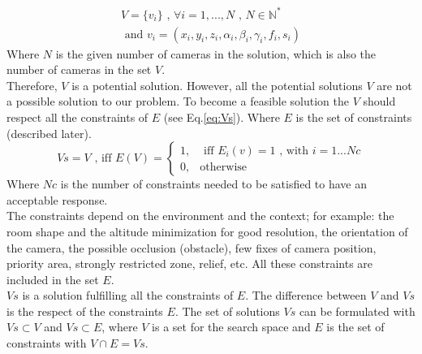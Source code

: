 \begin{equation}\label{eq:V}
\begin{split}
V= \{v_i\} \mbox{  , } \forall i=1,...,N \mbox{ , } N\in \mathbb{N}^*
\\
\mbox{ and } v_i= (x_i,y_i,z_i,\alpha_i ,\beta_i,\gamma_i,f_i,s_i)
\end{split}
\end{equation}
\noindent Where $N$ is the given number of cameras in the solution, which is also the number of cameras in the set $V$. \\
Therefore, $V$ is a potential solution. However, all the potential solutions $V$ are not a possible solution to our problem. To become a feasible solution the $V$ should respect all the constraints of $E$ (see Eq.\ref{eq:Vs}). Where $E$ is the set of constraints (described later).
\begin{equation}\label{eq:Vs}
Vs=V \mbox{ , iff } E(V)=\begin{cases}1, & \mbox{  iff } E_i(v)=1 \mbox{ , with } i=1...Nc \\ 0, & \mbox{otherwise} 
\end{cases} 
\end{equation}
Where $Nc$ is the number of constraints needed to be satisfied to have an acceptable response.\\
The constraints depend on the environment and the context; for example: the room shape and the altitude minimization for good resolution, the orientation of the camera, the possible occlusion (obstacle), few fixes of camera position, priority area, strongly restricted zone, relief, etc. All these constraints are included in the set $E$. \\
$Vs$ is a solution fulfilling all the constraints of $E$. The difference between $V$ and $Vs$ is the respect of the constraints $E$.%
The set of solutions $Vs$ can be formulated with $ Vs\subset V  $ and $ Vs\subset E$, where $V$ is a set for the search space and $E$ is the set of constraints with $V \cap E = Vs$. 
\fi
